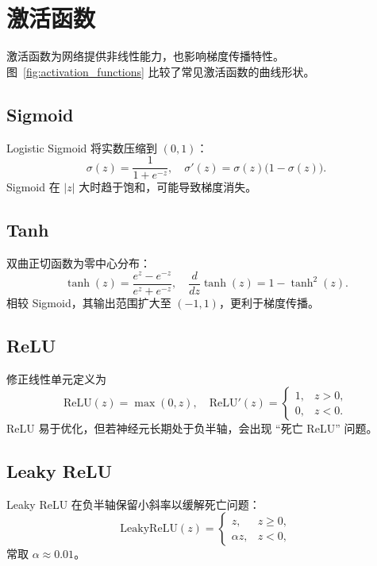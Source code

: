 ﻿\documentclass{ctexart}
\begin{document}
\section{激活函数}
激活函数为网络提供非线性能力，也影响梯度传播特性。图~\ref{fig:activation_functions} 比较了常见激活函数的曲线形状。

\subsection{Sigmoid}
Logistic Sigmoid 将实数压缩到 $\left(0,1\right)$：
\begin{equation}
  \sigma(z) = \frac{1}{1 + e^{-z}}, \quad \sigma'(z) = \sigma(z)\bigl(1-\sigma(z)\bigr).
\end{equation}
Sigmoid 在 $|z|$ 大时趋于饱和，可能导致梯度消失。

\subsection{Tanh}
双曲正切函数为零中心分布：
\begin{equation}
  \tanh(z) = \frac{e^{z} - e^{-z}}{e^{z} + e^{-z}}, \quad \frac{d}{dz}\tanh(z) = 1 - \tanh^2(z).
\end{equation}
相较 Sigmoid，其输出范围扩大至 $(-1,1)$，更利于梯度传播。

\subsection{ReLU}
修正线性单元定义为
\begin{equation}
  \mathrm{ReLU}(z) = \max(0, z), \quad \mathrm{ReLU}'(z) = \begin{cases}1,& z>0,\\0,& z<0.\end{cases}
\end{equation}
ReLU 易于优化，但若神经元长期处于负半轴，会出现 ``死亡 ReLU'' 问题。

\subsection{Leaky ReLU}
Leaky ReLU 在负半轴保留小斜率以缓解死亡问题：
\begin{equation}
  \mathrm{LeakyReLU}(z) = \begin{cases} z,& z \ge 0,\\ \alpha z,& z < 0,\end{cases}
\end{equation}
常取 $\alpha \approx 0.01$。
\end{document}
